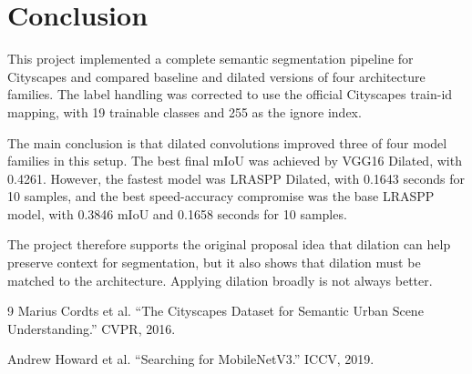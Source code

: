\documentclass[12pt]{article}
\begin{document}
\section{Conclusion}
This project implemented a complete semantic segmentation pipeline for Cityscapes and compared baseline and dilated versions of four architecture families. The label handling was corrected to use the official Cityscapes train-id mapping, with 19 trainable classes and 255 as the ignore index.

The main conclusion is that dilated convolutions improved three of four model families in this setup. The best final mIoU was achieved by VGG16 Dilated, with 0.4261. However, the fastest model was LRASPP Dilated, with 0.1643 seconds for 10 samples, and the best speed-accuracy compromise was the base LRASPP model, with 0.3846 mIoU and 0.1658 seconds for 10 samples.

The project therefore supports the original proposal idea that dilation can help preserve context for segmentation, but it also shows that dilation must be matched to the architecture. Applying dilation broadly is not always better.


\begin{thebibliography}{9}
Marius Cordts et al. ``The Cityscapes Dataset for Semantic Urban Scene Understanding.'' CVPR, 2016.

Andrew Howard et al. ``Searching for MobileNetV3.'' ICCV, 2019.
\end{thebibliography}
\end{document}
